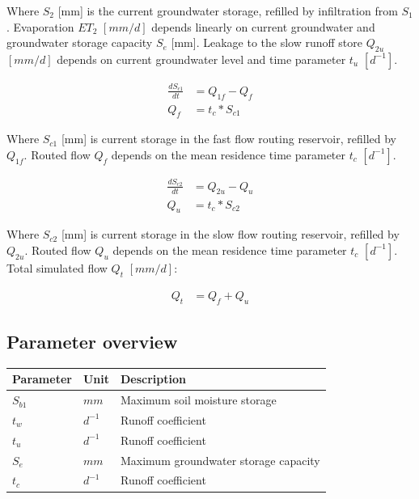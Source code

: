Where $S_2$ [mm] is the current groundwater storage, refilled by infiltration from $S_1$. Evaporation $ET_2$ $[mm/d]$ depends linearly on current groundwater and groundwater storage capacity $S_e$ [mm]. Leakage to the slow runoff store $Q_{2u}$ $[mm/d]$ depends on current groundwater level and time parameter $t_u$ $[d^{-1}]$. 

\begin{align}
	\frac{dS_{c1}}{dt} &= Q_{1f}-Q_{f}\\
	Q_f &= t_c*S_{c1}
\end{align}

Where $S_{c1}$ [mm] is current storage in the fast flow routing reservoir, refilled by $Q_{1f}$. Routed flow $Q_f$ depends on the mean residence time parameter $t_c$ $[d^{-1}]$.

\begin{align}
	\frac{dS_{c2}}{dt} &= Q_{2u}-Q_{u}\\
	Q_u &= t_c*S_{c2}
\end{align}

Where $S_{c2}$ [mm] is current storage in the slow flow routing reservoir, refilled by $Q_{2u}$. Routed flow $Q_u$ depends on the mean residence time parameter $t_c$ $[d^{-1}]$. Total simulated flow $Q_t$ $[mm/d]$:

\begin{align}
	Q_t &= Q_f + Q_u
\end{align}

\subsection{Parameter overview}
\begin{table}[htbp]
  \centering
    \begin{tabular}{lll}
    \toprule
    Parameter & Unit  & Description \\
    \midrule
    $S_{b1}$ & $mm$  & Maximum soil moisture storage \\
    $t_w$ & $d^{-1}$ & Runoff coefficient \\
    $t_u$ & $d^{-1}$ & Runoff coefficient \\
    $S_e$ & $mm$  & Maximum groundwater storage capacity \\
    $t_c$ & $d^{-1}$ & Runoff coefficient \\
    \bottomrule
    \end{tabular}%
  \label{tab:addlabel}%
\end{table}%

